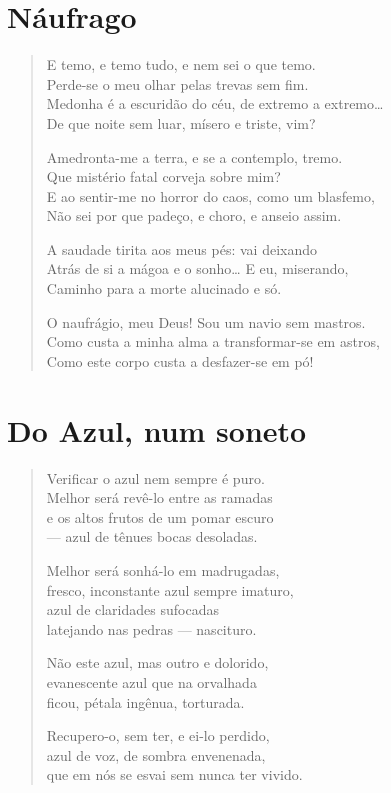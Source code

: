 \documentclass[10pt,a5paper,oneside]{book}
\begin{document}
\chapter{Náufrago}

\begin{verse}
E temo, e temo tudo, e nem sei o que temo.\\
Perde-se o meu olhar pelas trevas sem fim.\\
Medonha é a escuridão do céu, de extremo a extremo\ldots{}\\
De que noite sem luar, mísero e triste, vim?

Amedronta-me a terra, e se a contemplo, tremo.\\
Que mistério fatal corveja sobre mim?\\
E ao sentir-me no horror do caos, como um blasfemo,\\
Não sei por que padeço, e choro, e anseio assim.

A saudade tirita aos meus pés: vai deixando\\
Atrás de si a mágoa e o sonho\ldots{} E eu, miserando,\\
Caminho para a morte alucinado e só.

O naufrágio, meu Deus! Sou um navio sem mastros.\\
Como custa a minha alma a transformar-se em astros,\\
Como este corpo custa a desfazer-se em pó!
\end{verse}

\chapter{Do Azul, num soneto}

\begin{verse}
Verificar o azul nem sempre é puro.\\
Melhor será revê-lo entre as ramadas\\
e os altos frutos de um pomar escuro\\
--- azul de tênues bocas desoladas.

Melhor será sonhá-lo em madrugadas,\\
fresco, inconstante azul sempre imaturo,\\
azul de claridades sufocadas\\
latejando nas pedras --- nascituro.

Não este azul, mas outro e dolorido,\\
evanescente azul que na orvalhada\\
ficou, pétala ingênua, torturada.

Recupero-o, sem ter, e ei-lo perdido,\\
azul de voz, de sombra envenenada,\\
que em nós se esvai sem nunca ter vivido.
\end{verse}
\end{document}

